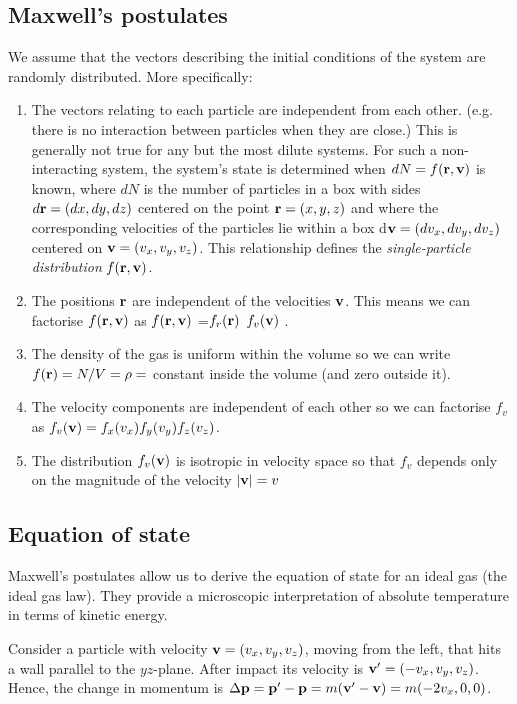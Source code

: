 \documentclass{article}
\begin{document}
\subsection*{Maxwell's postulates}
We assume that the vectors describing the initial conditions of the system are randomly distributed. More specifically:
\begin{enumerate}
\item The vectors relating to each particle are independent from each other. (e.g. there is no interaction between particles when they are close.) This is generally not true for any but the most dilute systems. For such a non-interacting system, the system's state is determined when $dN=f({\bf r},{\bf v})$ is known, where $dN$ is the number of particles in a box with sides $d{\bf r}=(dx,dy,dz)$ centered on the point ${\bf r} = (x,y,z)$ and where the corresponding velocities of the particles lie within a box d${\bf v}=(dv_x,dv_y,dv_z)$ centered on ${\bf v}=(v_x,v_y,v_z)$. This relationship defines the \emph{single-particle distribution} $f({\bf r},{\bf v})$.
\item The positions ${\bf r}$ are independent of the velocities ${\bf v}$. This means we can factorise $f({\bf r},{\bf v})$ as $f({\bf r},{\bf v})$ =$f_r({\bf r})$ $f_v({\bf v})$ .
\item The density of the gas is uniform within the volume so we can write $f({\bf r}) = N/V=\rho=$ constant inside the volume (and zero outside it).
\item The velocity components are independent of each other so we can factorise $f_v$ as $f_v({\bf v})=f_x(v_x)f_y(v_y)f_z(v_z)$.
\item The distribution $f_v({\bf v})$ is isotropic in velocity space so that $f_v$ depends only on the magnitude of the velocity $|{\bf v}| = v$
\end{enumerate}

\subsection*{Equation of state}
Maxwell's postulates allow us to derive the equation of state for an ideal gas (the ideal gas law). They provide a microscopic interpretation of absolute temperature in terms of kinetic energy.

Consider a particle with velocity ${\bf v} = (v_x,v_y,v_z)$, moving from the left, that hits a wall parallel to the $yz$-plane. After impact its velocity is ${\bf v'}=(-v_x,v_y,v_z)$. Hence, the change in momentum is $\Delta {\bf p}= {\bf p'} - {\bf p} = m({\bf v'}-{\bf v}) = m(-2v_x,0,0)$.
\end{document}
